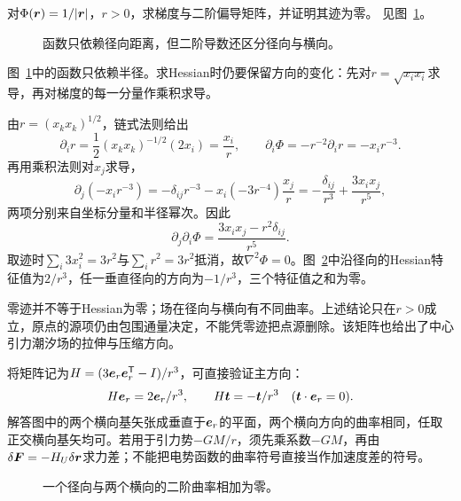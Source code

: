 \begin{exercise}[距离函数的梯度与Hessian]\label{ex:c3-h15}
对$\Phi(\bm{r})=1/|\bm{r}|$，$r>0$，求梯度与二阶偏导矩阵，并证明其迹为零。 见图~\ref{fig:c3-h15-q}。
\end{exercise}

\begin{figure}[H]\centering
{}
\caption{函数只依赖径向距离，但二阶导数还区分径向与横向。}\label{fig:c3-h15-q}
\end{figure}
\begin{solution}
图~\ref{fig:c3-h15-q}中的函数只依赖半径。求Hessian时仍要保留方向的变化：先对$r=\sqrt{x_ix_i}$求导，再对梯度的每一分量作乘积求导。


由$r=(x_kx_k)^{1/2}$，链式法则给出
\[\partial_i r=\frac12(x_kx_k)^{-1/2}(2x_i)=\frac{x_i}{r},\qquad
\partial_i\Phi=-r^{-2}\partial_i r=-x_ir^{-3}.\]
再用乘积法则对$x_j$求导，
\[\partial_j(-x_ir^{-3})=-\delta_{ij}r^{-3}
-x_i(-3r^{-4})\frac{x_j}{r}
=-\frac{\delta_{ij}}{r^3}+\frac{3x_ix_j}{r^5},\]
两项分别来自坐标分量和半径幂次。因此
\[\boxed{\partial_j\partial_i\Phi=\frac{3x_ix_j-r^2\delta_{ij}}{r^5}}.
\]
取迹时$\sum_i3x_i^2=3r^2$与$\sum_i r^2=3r^2$抵消，故$\nabla^2\Phi=0$。图~\ref{fig:c3-h15-s}中沿径向的Hessian特征值为$2/r^3$，任一垂直径向的方向为$-1/r^3$，三个特征值之和为零。

零迹并不等于Hessian为零；场在径向与横向有不同曲率。上述结论只在$r>0$成立，原点的源项仍由包围通量决定，不能凭零迹把点源删除。该矩阵也给出了中心引力潮汐场的拉伸与压缩方向。


将矩阵记为$H=(3\bm{e}_r\bm{e}_r^{\mathsf T}-I)/r^3$，可直接验证主方向：
\[H\bm{e}_r=2\bm{e}_r/r^3,\qquad
H\bm{t}=-\bm{t}/r^3\quad(\bm{t}\cdot\bm{e}_r=0).\]
解答图中的两个横向基矢张成垂直于$\bm{e}_r$的平面，两个横向方向的曲率相同，任取正交横向基矢均可。若用于引力势$-GM/r$，须先乘系数$-GM$，再由$\delta\bm{F}=-H_U\delta\bm{r}$求力差；不能把电势函数的曲率符号直接当作加速度差的符号。

\begin{figure}[H]\centering
{}
\caption{一个径向与两个横向的二阶曲率相加为零。}\label{fig:c3-h15-s}
\end{figure}
\end{solution}

